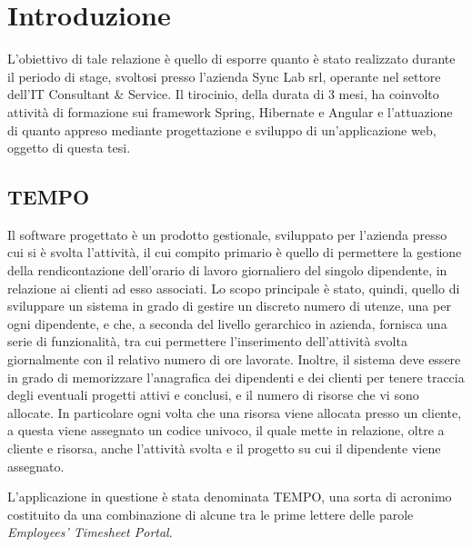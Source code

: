 \mainmatter
\chapter{Introduzione} \label{chapter:intro}
L'obiettivo di tale relazione è quello di esporre quanto è stato realizzato durante il periodo di stage, svoltosi presso l'azienda Sync Lab srl, operante nel settore dell'IT Consultant \& Service. Il tirocinio, della durata di 3 mesi, ha coinvolto attività di formazione sui framework Spring, Hibernate e Angular e l'attuazione di quanto appreso mediante progettazione e sviluppo di un'applicazione web, oggetto di questa tesi.

\section{TEMPO}
Il software progettato è un prodotto gestionale, sviluppato per l'azienda presso cui si è svolta l'attività, il cui compito primario è quello di permettere la gestione della rendicontazione dell'orario di lavoro giornaliero del singolo dipendente, in relazione ai clienti ad esso associati. Lo scopo principale è stato, quindi, quello di sviluppare un sistema in grado di gestire un discreto numero di utenze, una per ogni dipendente, e che, a seconda del livello gerarchico in azienda, fornisca una serie di funzionalità, tra cui permettere l'inserimento dell'attività svolta giornalmente con il relativo numero di ore lavorate. Inoltre, il sistema deve essere in grado di memorizzare l'anagrafica dei dipendenti e dei clienti per tenere traccia degli eventuali progetti attivi e conclusi, e il numero di risorse che vi sono allocate. In particolare ogni volta che una risorsa viene allocata presso un cliente, a questa viene assegnato un codice univoco, il quale mette in relazione, oltre a cliente e risorsa, anche l'attività svolta e il progetto su cui il dipendente viene assegnato.

L'applicazione in questione è stata denominata TEMPO, una sorta di acronimo costituito da una combinazione di alcune tra le prime lettere delle parole \textit{Employees' Timesheet Portal}.

